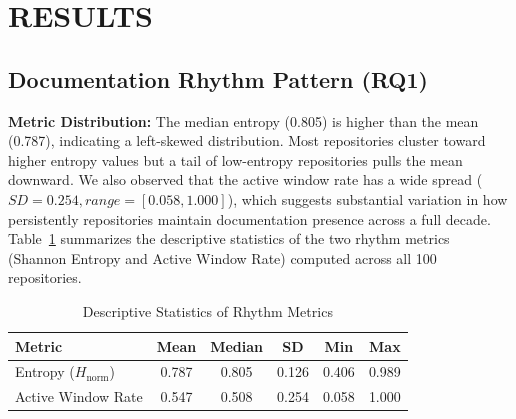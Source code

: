 \documentclass[10pt,conference]{IEEEtran}
\begin{document}
{\section{RESULTS}

\subsection{Documentation Rhythm Pattern (RQ1)}

{\textbf{Metric Distribution:} The median entropy (0.805) is higher than the mean (0.787), indicating a left-skewed distribution. Most repositories cluster toward higher entropy values but a tail of low-entropy repositories pulls the mean downward. We also observed that the active window rate has a wide spread ($SD = 0.254, range = [0.058, 1.000]$), which suggests substantial variation in how persistently repositories maintain documentation presence across a full decade.
Table~\ref{tab:descriptive_rhythm_metrics} summarizes the descriptive statistics of the two rhythm metrics (Shannon Entropy and Active Window Rate) computed across all 100 repositories.
\vspace{-10pt}
\begin{table}[h]
\centering
\caption{Descriptive Statistics of Rhythm Metrics}
\label{tab:descriptive_rhythm_metrics}
\renewcommand{\arraystretch}{1.3}
\begin{tabular}{p{2.5cm}ccccc}
\toprule
\textbf{Metric} & \textbf{Mean} & \textbf{Median} & \textbf{SD} & \textbf{Min} & \textbf{Max} \\
\midrule
Entropy ($H_{\text{norm}}$) & 0.787 & 0.805 & 0.126 & 0.406 & 0.989 \\
Active Window Rate & 0.547 & 0.508 & 0.254 & 0.058 & 1.000 \\
\bottomrule
\end{tabular}
\end{table}







}}
\end{document}
